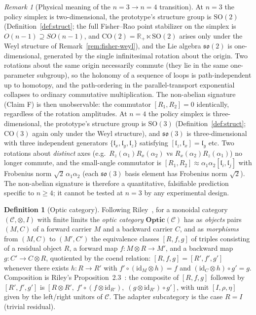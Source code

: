 \documentclass[11pt,a4paper]{article}
\theoremstyle{plain}
\theoremstyle{definition}
\newtheorem{definition}[theorem]{Definition}
\theoremstyle{remark}
\newtheorem{remark}[theorem]{Remark}
\newcommand{\CC}{\mathcal{C}}
\newcommand{\RR}{\mathbb{R}}
\newcommand{\SO}{\mathrm{SO}}
\newcommand{\CO}{\mathrm{CO}}
\newcommand{\so}{\mathfrak{so}}
\newcommand{\Optic}{\mathbf{Optic}}
\begin{document}
\begin{remark}[Physical meaning of the $n=3\to n=4$ transition]
\label{rem:n3-n4}
At $n=3$ the policy simplex is two-dimensional, the prototype's
structure group is $\SO(2)$
(Definition~\ref{def:struct}; the full Fisher--Rao point stabilizer
on the simplex is $O(n-1)\supseteq SO(n-1)$, and $\CO(2)=\RR_+
\ltimes\SO(2)$ arises only under the Weyl structure of
Remark~\ref{rem:fisher-weyl}), and the Lie algebra
$\so(2)$ is one-dimensional, generated by the single infinitesimal
rotation about the origin. Two rotations about the same origin
necessarily commute (they lie in the same one-parameter subgroup), so
the holonomy of a sequence of loops is path-independent up to
homotopy, and the path-ordering in the parallel-transport exponential
collapses to ordinary commutative multiplication. The non-abelian
signature (Claim F) is then unobservable: the commutator
$[R_1,R_2]=0$ identically, regardless of the rotation amplitudes.
At $n=4$ the policy simplex is three-dimensional, the prototype's
structure group is $\SO(3)$ (Definition~\ref{def:struct}; $\CO(3)$
again only under the Weyl structure), and $\so(3)$ is
three-dimensional with
three independent generators $\{\mathfrak{l}_x,\mathfrak{l}_y,
\mathfrak{l}_z\}$ satisfying $[\mathfrak{l}_z,\mathfrak{l}_x]
=\mathfrak{l}_y$ etc. Two rotations about \emph{distinct} axes (e.g.\
$R_z(\alpha_1)R_x(\alpha_2)$ vs $R_x(\alpha_2)R_z(\alpha_1)$) no
longer commute, and the small-angle commutator is
$[R_1,R_2]\approx\alpha_1\alpha_2[\mathfrak{l}_i,\mathfrak{l}_j]$
with Frobenius norm $\sqrt{2}\,\alpha_1\alpha_2$ (each
$\so(3)$ basis element has Frobenius norm $\sqrt{2}$). The
non-abelian signature is therefore a quantitative, falsifiable
prediction specific to $n\geq 4$; it cannot be tested at $n=3$ by any
experimental design.
\end{remark}

\begin{definition}[Optic category]
\label{def:optic}
Following Riley~\cite{riley2018optics}, for a monoidal category
$(\CC, \otimes, I)$ with finite limits the \emph{optic category}
$\Optic(\CC)$ has as \emph{objects} pairs $(M, C)$ of a forward
carrier $M$ and a backward carrier $C$, and as \emph{morphisms} from
$(M, C)$ to $(M', C')$ the equivalence classes $[R, f, g]$ of triples
consisting of a residual object $R$, a forward map
$f : M \otimes R \to M'$, and a backward map $g : C' \to C \otimes
R$, quotiented by the coend relation: $[R, f, g] = [R', f', g']$
whenever there exists $h : R \to R'$ with
$f' \circ (\mathrm{id}_M \otimes h) = f$ and
$(\mathrm{id}_C \otimes h) \circ g' = g$. Composition is
Riley's Proposition~2.3~\cite{riley2018optics}: the composite of
$[R, f, g]$ followed by $[R', f', g']$ is
$[R \otimes R',\; f' \circ (f \otimes \mathrm{id}_{R'}),\;
(g \otimes \mathrm{id}_{R'}) \circ g']$, with unit
$[I, \rho, \eta]$ given by the left/right unitors of $\CC$. The
adapter subcategory is the case $R = I$ (trivial residual).
\end{definition}
\end{document}
